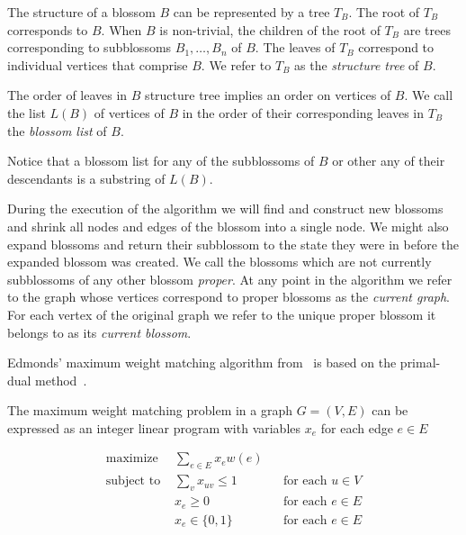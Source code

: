 \begin{defn}
    The structure of a blossom $B$ can be represented by a tree $T_B$. The root of $T_B$ corresponds to $B$. When $B$ is non-trivial, the children of the root of $T_B$ are trees corresponding to subblossoms $B_1, \dots, B_n$ of $B$. The leaves of $T_B$ correspond to individual vertices that comprise $B$. We refer to $T_B$ as the \emph{structure tree} of $B$.
\end{defn}

\begin{defn}
    The order of leaves in $B$ structure tree implies an order on vertices of $B$. We call the list $L(B)$ of vertices of $B$ in the order of their corresponding leaves in $T_B$ the \emph{blossom list} of $B$.
\end{defn}

Notice that a blossom list for any of the subblossoms of $B$ or other any of their descendants is a substring of $L(B)$.

During the execution of the algorithm we will find and construct new blossoms and shrink all nodes and edges of the blossom into a single node. We might also expand blossoms and return their subblossom to the state they were in before the expanded blossom was created. We call the blossoms which are not currently subblossoms of any other blossom \emph{proper}. At any point in the algorithm we refer to the graph whose vertices correspond to proper blossoms as the \emph{current graph}. For each vertex of the original graph we refer to the unique proper blossom it belongs to  as its \emph{current blossom}.

Edmonds' maximum weight matching algorithm from~\cite{edmonds1965maximum} is based on the primal-dual method~\cite{lawler2001combinatorial}.

The maximum weight matching problem in a graph $G=(V,E)$ can be expressed as an integer linear program with variables $x_e$ for each edge $e \in E$

\begin{align*}
\text{maximize }   & \sum_{e \in E} x_e w(e) \\
\text{subject to } & \sum_v x_{uv} \leq 1 &&\text{for each $u \in V$} \\
                   & x_e \geq 0           &&\text{for each $e \in E$} \\
                   & x_e \in\{0, 1\}      &&\text{for each $e \in E$}
\end{align*}

